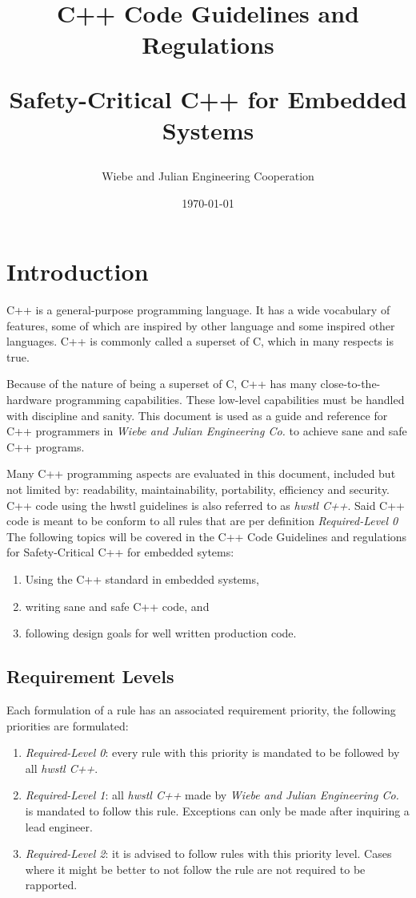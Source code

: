 \documentclass[12pt]{article}
\title{
      C++ Code Guidelines and Regulations \\
      \begin{large}
         Safety-Critical C++ for Embedded Systems
      \end{large}
}
\date{\today}
\author{Wiebe and Julian Engineering Cooperation}
\newcommand{\requirementpriority}[1]{\emph{Required-Level #1}}
\begin{document}
\maketitle

\newpage
{} %
\tableofcontents
\newpage
{} %

\newpage
\section{Introduction}
C++ is a general-purpose programming language. It has a wide vocabulary of
features, some of which are inspired by other language and some inspired other
languages. C++ is commonly called a superset of C, which in many respects
is true.

Because of the nature of being a superset of C, C++ has many
close-to-the-hardware programming capabilities. These low-level capabilities
must be handled with discipline and sanity. This document is used as a guide
and reference for C++ programmers in \textit{Wiebe and Julian Engineering Co.}
to achieve sane and safe C++ programs.

Many C++ programming aspects are evaluated in this document, included but not
limited by: readability, maintainability, portability, efficiency and security. \\
C++ code using the hwstl guidelines is also referred to as \textit{hwstl C++}.
Said C++ code is meant to be conform to all rules that are per definition
\requirementpriority{0} \\
The following topics will be covered in the C++ Code Guidelines and regulations
for Safety-Critical C++ for embedded sytems:
\begin{enumerate}
   \item Using the C++ standard in embedded systems,
   \item writing sane and safe C++ code, and
   \item following design goals for well written production code.
\end{enumerate}
\subsection{Requirement Levels}
Each formulation of a rule has an associated requirement priority, the
following priorities are formulated:
\begin{enumerate}
   \item \requirementpriority{0}: every rule with this priority is mandated to
be followed by all \textit{hwstl C++}.
   \item \requirementpriority{1}: all \textit{hwstl C++} made by \textit{Wiebe
and Julian Engineering Co.} is mandated to follow this rule. Exceptions can
only be made after inquiring a lead engineer.
   \item \requirementpriority{2}: it is advised to follow rules with this
priority level. Cases where it might be better to not follow the rule are not
required to be rapported.
\end{enumerate}
\end{document}
